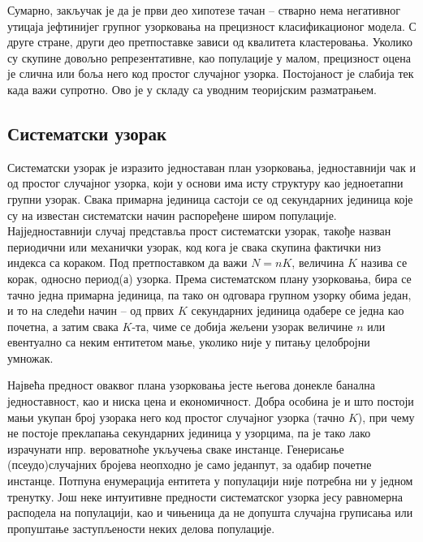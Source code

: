 \documentclass[a4paper]{article}
\begin{document}
Сумарно, закључак је да је први део хипотезе тачан -- стварно нема негативног утицаја јефтинијег групног узорковања на прецизност класификационог модела. С друге стране, други део претпоставке зависи од квалитета кластеровања. Уколико су скупине довољно репрезентативне, као популације у малом, прецизност оцена је слична или боља него код простог случајног узорка. Постојаност је слабија тек када важи супротно. Ово је у складу са уводним теоријским разматрањем.

\subsection{Систематски узорак}

Систематски узорак је изразито једноставан план узорковања, једноставнији чак и од простог случајног узорка, који у основи има исту структуру као једноетапни групни узорак.\cite{prez9} Свака примарна јединица састоји се од секундарних јединица које су на известан систематски начин распоређене широм популације. Најједноставнији случај представља прост систематски узорак, такође назван периодични или механички узорак, код кога је свака скупина фактички низ индекса са кораком. Под претпоставком да важи $N = nK$, величина $K$ назива се корак, односно период(а) узорка. Према систематском плану узорковања, бира се тачно једна примарна јединица, па тако он одговара групном узорку обима један, и то на следећи начин -- од првих $K$ секундарних јединица одабере се једна као почетна, а затим свака $K$-та, чиме се добија жељени узорак величине $n$ или евентуално са неким ентитетом мање, уколико није у питању целобројни умножак.

Највећа предност оваквог плана узорковања јесте његова донекле банална једноставност, као и ниска цена и економичност. Добра особина је и што постоји мањи укупан број узорака него код простог случајног узорка (тачно $K$), при чему не постоје преклапања секундарних јединица у узорцима, па је тако лако израчунати нпр. вероватноће укључења сваке инстанце. Генерисање (псеудо)случајних бројева неопходно је само једанпут, за одабир почетне инстанце. Потпуна енумерација ентитета у популацији није потребна ни у једном тренутку. Још неке интуитивне предности систематског узорка јесу равномерна расподела на популацији, као и чињеница да не допушта случајна груписања или пропуштање заступљености неких делова популације.
\end{document}
